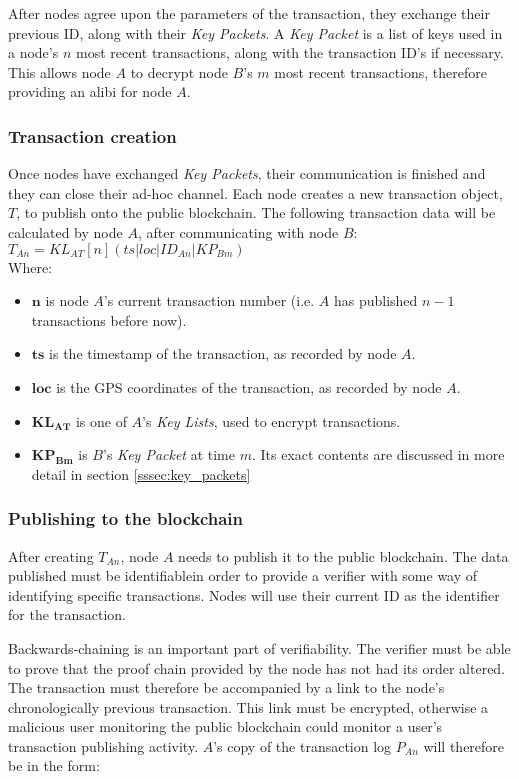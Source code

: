 \documentclass[12pt]{article}
\begin{document}
After nodes agree upon the parameters of the transaction, they exchange their previous ID, along with their \textit{Key Packets}. A \textit{Key Packet} is a list of keys used in a node's $n$ most recent transactions, along with the transaction ID's if necessary. This allows node $A$ to decrypt node $B$'s $m$ most recent transactions, therefore providing an alibi for node $A$.

\subsubsection{Transaction creation}
Once nodes have exchanged \textit{Key Packets}, their communication is finished and they can close their ad-hoc channel. Each node creates a new transaction object, $T$, to publish onto the public blockchain. The following transaction data will be calculated by node $A$, after communicating with node $B$:
\\

$T_{An} = KL_{AT}[n](ts|loc|ID_{An}|KP_{Bm})$
\\

Where:
\begin{itemize}[noitemsep,topsep=0pt]
	\item[] $\mathbf{n}$ is node $A$'s current transaction number (i.e. $A$ has published $n-1$ transactions before now).
	\item[] $\mathbf{ts}$ is the timestamp of the transaction, as recorded by node $A$.
	\item[] $\mathbf{loc}$ is the GPS coordinates of the transaction, as recorded by node $A$.
	\item[] $\mathbf{KL_{AT}}$ is one of $A$'s \textit{Key Lists}, used to encrypt transactions.
	\item[] $\mathbf{KP_{Bm}}$ is $B$'s \textit{Key Packet} at time $m$. Its exact contents are discussed in more detail in section \ref{sssec:key_packets}
\end{itemize}

\subsubsection{Publishing to the blockchain}
After creating $T_{An}$, node $A$ needs to publish it to the public blockchain. The data published must be identifiablein order to provide a verifier with some way of identifying specific transactions. Nodes will use their current ID as the identifier for the transaction.

Backwards-chaining is an important part of verifiability. The verifier must be able to prove that the proof chain provided by the node has not had its order altered. The transaction must therefore be accompanied by a link to the node's chronologically previous transaction. This link must be encrypted, otherwise a malicious user monitoring the public blockchain could monitor a user's transaction publishing activity. $A$'s copy of the transaction log $P_{An}$ will therefore be in the form:
\end{document}
